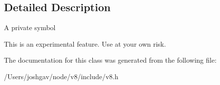 \subsection{Detailed Description}
A private symbol

This is an experimental feature. Use at your own risk. 

The documentation for this class was generated from the following file\+:\begin{DoxyCompactItemize}
\item 
/\+Users/joshgav/node/v8/include/v8.\+h\end{DoxyCompactItemize}
